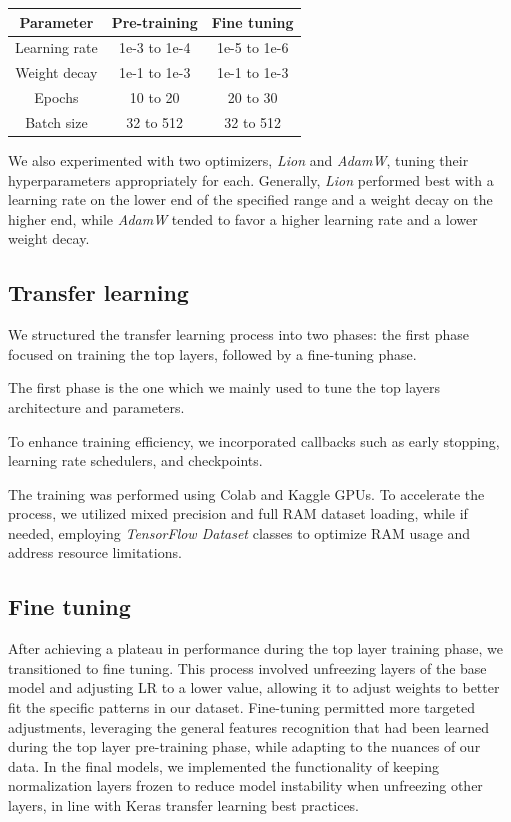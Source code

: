 \documentclass[11pt]{article}
\begin{document}
\begin{table}[h!]
    \centering
    \begin{tabular}{|c|c|c|}
        \hline
        \textbf{Parameter} & \textbf{Pre-training} & \textbf{Fine tuning} \\ \hline
        Learning rate & 1e-3 to 1e-4 & 1e-5 to 1e-6 \\ \hline
        Weight decay & 1e-1 to 1e-3 & 1e-1 to 1e-3 \\ \hline
        Epochs & 10 to 20 & 20 to 30 \\ \hline
        Batch size & 32 to 512 & 32 to 512 \\ \hline
    \end{tabular}
\end{table}
We also experimented with two optimizers, \textit{Lion} and \textit{AdamW}, tuning their hyperparameters appropriately for each. Generally, \textit{Lion} performed best with a learning rate on the lower end of the specified range and a weight decay on the higher end, while \textit{AdamW} tended to favor a higher learning rate and a lower weight decay.
\subsection{Transfer learning}

We structured the transfer learning process into two phases: the first phase focused on training the top layers, followed by a fine-tuning phase.

The first phase is the one which we mainly used to tune the top layers architecture and parameters.

To enhance training efficiency, we incorporated callbacks such as early stopping, learning rate schedulers, and checkpoints.

The training was performed using Colab and Kaggle GPUs. To accelerate the process, we utilized mixed precision and full RAM dataset loading, while if needed, employing \textit{TensorFlow Dataset} classes to optimize RAM usage and address resource limitations.

\subsection{Fine tuning}

After achieving a plateau in performance during the top layer training phase, we transitioned to fine tuning. 
This process involved unfreezing layers of the base model and adjusting LR to a lower value, allowing it to adjust weights to better fit the specific patterns in our dataset. 
Fine-tuning permitted more targeted adjustments, leveraging the general features recognition that had been learned during the top layer pre-training phase, while adapting to the nuances of our data. In the final models, we implemented the functionality of keeping normalization layers frozen to reduce model instability when unfreezing other layers, in line with Keras transfer learning best practices.
\end{document}
